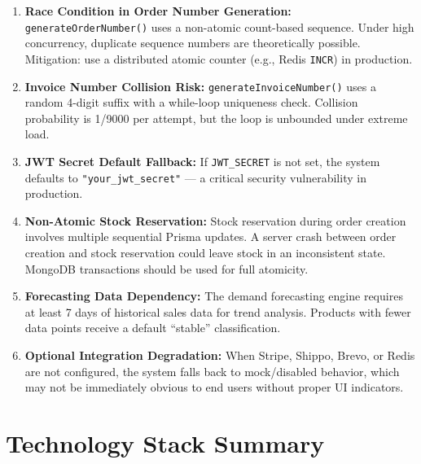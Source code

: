 \documentclass[12pt,a4paper]{report}
\begin{document}
\begin{tcolorbox}[warningbox,title={Known Issues and Technical Challenges}]
\begin{enumerate}[leftmargin=1.5em]
  \item \textbf{Race Condition in Order Number Generation:} \texttt{generateOrderNumber()} uses a non-atomic count-based sequence. Under high concurrency, duplicate sequence numbers are theoretically possible. Mitigation: use a distributed atomic counter (e.g., Redis \texttt{INCR}) in production.
  \item \textbf{Invoice Number Collision Risk:} \texttt{generateInvoiceNumber()} uses a random 4-digit suffix with a while-loop uniqueness check. Collision probability is 1/9000 per attempt, but the loop is unbounded under extreme load.
  \item \textbf{JWT Secret Default Fallback:} If \texttt{JWT\_SECRET} is not set, the system defaults to \texttt{"your\_jwt\_secret"} --- a critical security vulnerability in production.
  \item \textbf{Non-Atomic Stock Reservation:} Stock reservation during order creation involves multiple sequential Prisma updates. A server crash between order creation and stock reservation could leave stock in an inconsistent state. MongoDB transactions should be used for full atomicity.
  \item \textbf{Forecasting Data Dependency:} The demand forecasting engine requires at least 7 days of historical sales data for trend analysis. Products with fewer data points receive a default ``stable'' classification.
  \item \textbf{Optional Integration Degradation:} When Stripe, Shippo, Brevo, or Redis are not configured, the system falls back to mock/disabled behavior, which may not be immediately obvious to end users without proper UI indicators.
\end{enumerate}
\end{tcolorbox}

\section{Technology Stack Summary}
\end{document}
